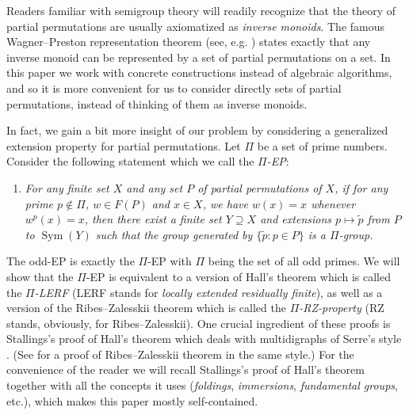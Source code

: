 \documentclass[11pt]{amsart}
\theoremstyle{definition}
\theoremstyle{definition}
\numberwithin{equation}{section}
\begin{document}
Readers familiar with semigroup theory will readily recognize that the theory of partial permutations are usually axiomatized as \emph{inverse monoids}. The famous Wagner--Preston representation theorem (see, e.g. \cite[Section 1.5]{La98}) states exactly that any inverse monoid can be represented by a set of partial permutations on a set. In this paper we work with concrete constructions instead of algebraic algorithms, and so it is more convenient for us to consider directly sets of partial permutations, instead of thinking of them as inverse monoids.

In fact, we gain a bit more insight of our problem by considering a generalized extension property for partial permutations. Let $\Pi$ be a set of prime numbers. Consider the following statement which we call the \emph{$\Pi$-EP}:
\begin{enumerate}
\item[(d)] \emph{For any finite set $X$ and any set $P$ of partial permutations of $X$, if for any prime $p\not\in \Pi$, $w\in F(P)$ and $x\in X$, we have $w(x)=x$ whenever $w^p(x)=x$, then there exist a finite set $Y\supseteq X$ and extensions $p\mapsto \tilde{p}$ from $P$ to $\operatorname{Sym}(Y)$ such that the group generated by $\{\tilde{p}\colon p\in P\}$ is a $\Pi$-group. }
\end{enumerate}
The odd-EP is exactly the $\Pi$-EP with $\Pi$ being the set of all odd primes. We will show that the $\Pi$-EP is equivalent to a version of Hall's theorem which is called the \emph{$\Pi$-LERF} (LERF stands for \emph{locally extended residually finite}), as well as a version of the Ribes--Zalesskii theorem which is called the \emph{$\Pi$-RZ-property} (RZ stands, obviously, for Ribes--Zalesskii). One crucial ingredient of these proofs is Stallings's proof of Hall's theorem \cite{St83} which deals with multidigraphs of Serre's style \cite{SerreBook}. (See \cite{AS05, Zh25} for a proof of Ribes--Zalesskii theorem in the same style.) For the convenience of the reader we will recall Stallings's proof of Hall's theorem together with all the concepts it uses (\emph{foldings}, \emph{immersions}, \emph{fundamental groups}, etc.), which makes this paper mostly self-contained. 
\end{document}
